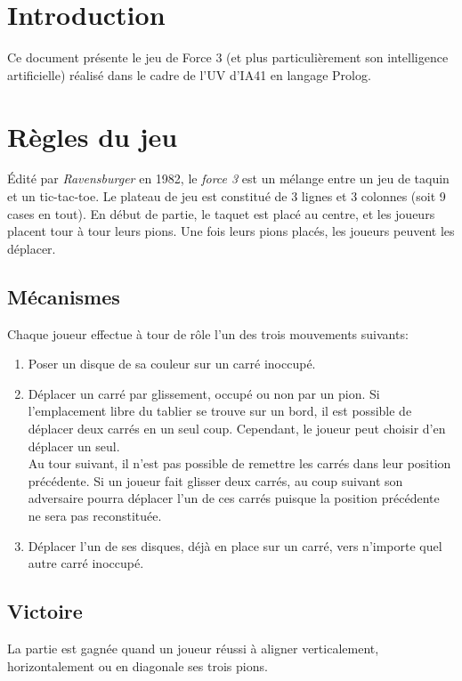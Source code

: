 \documentclass[a4paper,12pt]{article}
\begin{document}
\tableofcontents
\newpage

\section*{Introduction}
Ce document présente le jeu de Force 3 (et plus particulièrement son intelligence artificielle) réalisé dans le cadre de l'UV d'IA41 en langage Prolog.

\section{Règles du jeu}
Édité par \emph{Ravensburger} en 1982, le \emph{force 3} est un mélange entre un jeu de taquin et un tic-tac-toe. Le plateau de jeu est constitué de 3 lignes et 3 colonnes (soit 9 cases en tout). En début de partie, le taquet est placé au centre, et les joueurs placent tour à tour leurs pions. Une fois leurs pions placés, les joueurs peuvent les déplacer.

\subsection{Mécanismes}
Chaque joueur effectue à tour de rôle l'un des trois mouvements suivants:
\begin{enumerate}
	\item Poser un disque de sa couleur sur un carré inoccupé.
	\item Déplacer un carré par glissement, occupé ou non par un pion. Si l'emplacement libre du tablier se trouve sur un bord, il est possible de déplacer deux carrés en un seul coup. Cependant, le joueur peut choisir d'en déplacer un seul.\\
	 Au tour suivant, il n'est pas possible de remettre les carrés dans leur position précédente. Si un joueur fait glisser deux carrés, au coup suivant son adversaire pourra déplacer l'un de ces carrés puisque la position précédente ne sera pas reconstituée.
    \item Déplacer l'un de ses disques, déjà en place sur un carré, vers n'importe quel autre carré inoccupé.
\end{enumerate}
    
\subsection{Victoire}
La partie est gagnée quand un joueur réussi à aligner verticalement, horizontalement ou en diagonale ses trois pions.
\clearpage
\end{document}
